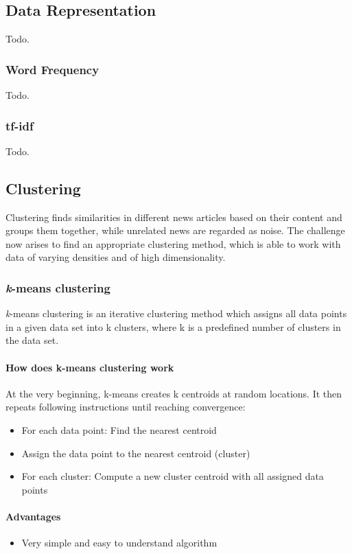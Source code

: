 \subsection{Data Representation}
Todo.

\subsubsection{Word Frequency}
Todo.

\subsubsection{tf-idf}
Todo.

\subsection{Clustering}
Clustering finds similarities in different news articles based on their content and groups them together,
while unrelated news are regarded as noise.
The challenge now arises to find an appropriate clustering method,
which is able to work with data of varying densities and of high dimensionality.


\subsubsection{\textit{k}-means clustering}
\textit{k}-means clustering is an iterative clustering method which assigns all data points in a given data set
into k clusters, where k is a predefined number of clusters in the data set.

\paragraph{How does k-means clustering work}
At the very beginning, k-means creates k centroids at random locations.
It then repeats following instructions until reaching convergence:

\begin{itemize}
    \item For each data point: Find the nearest centroid
    \item Assign the data point to the nearest centroid (cluster)
    \item For each cluster: Compute a new cluster centroid with all assigned data points
\end{itemize}

\paragraph{Advantages}
\begin{itemize}
    \item Very simple and easy to understand algorithm
\end{itemize}

